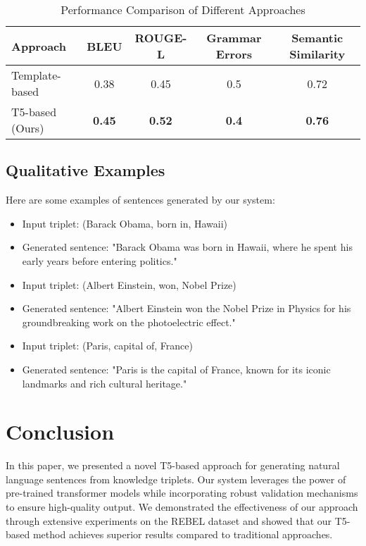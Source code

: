 \documentclass[3p,times,procedia]{elsarticle}
\begin{document}
\begin{table}[ht!]
    \centering
    \caption{Performance Comparison of Different Approaches}
    \label{table:performance}
    \begin{tabular}{lcccc}
        \toprule
        Approach & BLEU & ROUGE-L & Grammar Errors & Semantic Similarity \\
        \midrule
        Template-based & 0.38 & 0.45 & 0.5 & 0.72 \\
        T5-based (Ours) & \textbf{0.45} & \textbf{0.52} & \textbf{0.4} & \textbf{0.76} \\
        \bottomrule
    \end{tabular}
\end{table}

\subsection{Qualitative Examples}
Here are some examples of sentences generated by our system:
\begin{itemize}
    \item Input triplet: (Barack Obama, born in, Hawaii)
    \item Generated sentence: "Barack Obama was born in Hawaii, where he spent his early years before entering politics."
    
    \item Input triplet: (Albert Einstein, won, Nobel Prize)
    \item Generated sentence: "Albert Einstein won the Nobel Prize in Physics for his groundbreaking work on the photoelectric effect."
    
    \item Input triplet: (Paris, capital of, France)
    \item Generated sentence: "Paris is the capital of France, known for its iconic landmarks and rich cultural heritage."
\end{itemize}

\section{Conclusion}
In this paper, we presented a novel T5-based approach for generating natural language sentences from knowledge triplets. Our system leverages the power of pre-trained transformer models while incorporating robust validation mechanisms to ensure high-quality output. We demonstrated the effectiveness of our approach through extensive experiments on the REBEL dataset and showed that our T5-based method achieves superior results compared to traditional approaches.
\end{document}
